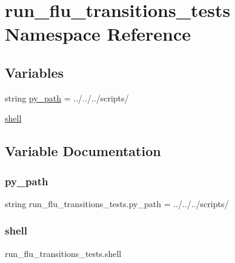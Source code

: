 \hypertarget{namespacerun__flu__transitions__tests}{}\section{run\+\_\+flu\+\_\+transitions\+\_\+tests Namespace Reference}
\label{namespacerun__flu__transitions__tests}
\subsection*{Variables}
\begin{DoxyCompactItemize}
\item 
string \hyperlink{namespacerun__flu__transitions__tests_ac0d91076fd03009728aee6cfba6ba1ac}{py\+\_\+path} = \textquotesingle{}../../../scripts/\textquotesingle{}
\item 
\hyperlink{namespacerun__flu__transitions__tests_a449ecd8a37b29e7455bf5006b2d47852}{shell}
\end{DoxyCompactItemize}


\subsection{Variable Documentation}
\mbox{\label{namespacerun__flu__transitions__tests_ac0d91076fd03009728aee6cfba6ba1ac}} 
\subsubsection{\texorpdfstring{py\+\_\+path}{py\_path}}
{\footnotesize\ttfamily string run\+\_\+flu\+\_\+transitions\+\_\+tests.\+py\+\_\+path = \textquotesingle{}../../../scripts/\textquotesingle{}}

\mbox{\label{namespacerun__flu__transitions__tests_a449ecd8a37b29e7455bf5006b2d47852}} 
\subsubsection{\texorpdfstring{shell}{shell}}
{\footnotesize\ttfamily run\+\_\+flu\+\_\+transitions\+\_\+tests.\+shell}

